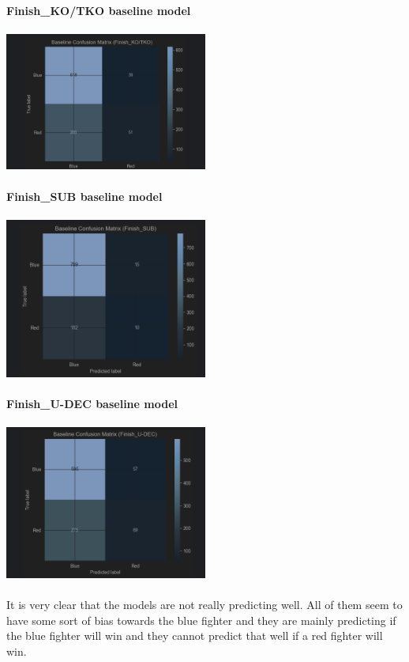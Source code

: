 \documentclass{article}
\begin{document}
	{\large \textbf{Finish\_KO/TKO baseline model}}\\\\
	\includegraphics[width=0.5\textwidth]{images/CM_KO-TKO.png}\\\\
	\newpage
	{\large \textbf{Finish\_SUB baseline model}}\\\\
	\includegraphics[width=0.5\textwidth]{images/CM_Submission.png}\\\\
	
	{\large \textbf{Finish\_U-DEC baseline model}}\\\\
	\includegraphics[width=0.5\textwidth]{images/CM_U-DEC.png}\\\\
	
It is very clear that the models are not really predicting well. All of them seem to have some sort of bias towards the blue fighter and they are mainly predicting if the blue fighter will win and they cannot predict that well if a red fighter will win.
\end{document}
